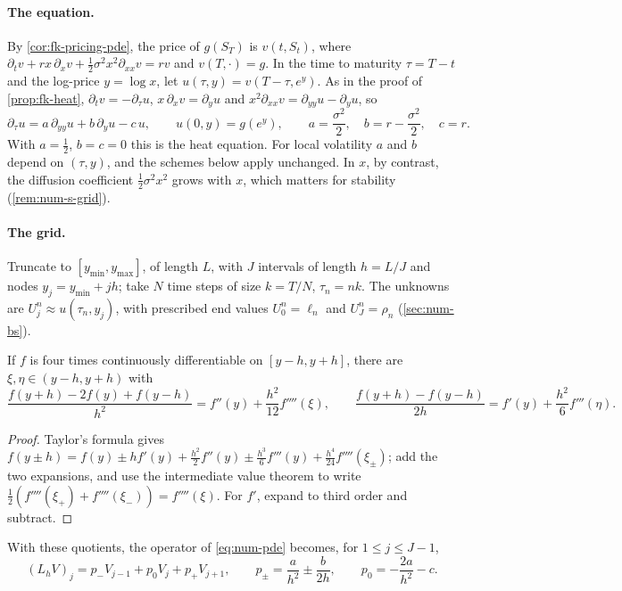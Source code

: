 \paragraph{The equation.} By \cref{cor:fk-pricing-pde}, the price of $g(S_T)$ is $v(t,S_t)$, where
$\partial_tv+rx\,\partial_xv+\frac12\sigma^2x^2\partial_{xx}v=rv$ and $v(T,\cdot)=g$. In the time to maturity
$\tau=T-t$ and the log-price $y=\log x$, let $u(\tau,y)=v(T-\tau,e^y)$. As in the proof of
\cref{prop:fk-heat}, $\partial_tv=-\partial_\tau u$, $x\,\partial_xv=\partial_yu$ and $x^2\partial_{xx}v=\partial_{yy}u-\partial_yu$, so
\begin{equation}\label{eq:num-pde}
  \partial_\tau u=a\,\partial_{yy}u+b\,\partial_yu-c\,u,\qquad u(0,y)=g(e^y),\qquad
  a=\frac{\sigma^2}2,\quad b=r-\frac{\sigma^2}2,\quad c=r .
\end{equation}
With $a=\frac12$, $b=c=0$ this is the heat equation. For local volatility $a$ and $b$ depend on
$(\tau,y)$, and the schemes below apply unchanged. In $x$, by contrast, the diffusion coefficient
$\frac12\sigma^2x^2$ grows with $x$, which matters for stability (\cref{rem:num-s-grid}).

\paragraph{The grid.} Truncate to $[y_{\min},y_{\max}]$, of length $L$, with $J$ intervals of length
$h=L/J$ and nodes $y_j=y_{\min}+jh$; take $N$ time steps of size $k=T/N$, $\tau_n=nk$. The unknowns
are $U^n_j\approx u(\tau_n,y_j)$, with prescribed end values $U^n_0=\ell_n$ and $U^n_J=\rho_n$
(\cref{sec:num-bs}).

\begin{lemma}\label{lem:num-taylor}
If $f$ is four times continuously differentiable on $[y-h,y+h]$, there are $\xi,\eta\in(y-h,y+h)$ with
\[
  \frac{f(y+h)-2f(y)+f(y-h)}{h^2}=f''(y)+\frac{h^2}{12}f''''(\xi),\qquad
  \frac{f(y+h)-f(y-h)}{2h}=f'(y)+\frac{h^2}{6}f'''(\eta).
\]
\end{lemma}

\begin{proof}
Taylor's formula gives
$f(y\pm h)=f(y)\pm hf'(y)+\frac{h^2}2f''(y)\pm\frac{h^3}6f'''(y)+\frac{h^4}{24}f''''(\xi_\pm)$; add the two
expansions, and use the intermediate value theorem to write
$\frac12(f''''(\xi_+)+f''''(\xi_-))=f''''(\xi)$. For $f'$, expand to third order and subtract.
\end{proof}

With these quotients, the operator of \eqref{eq:num-pde} becomes, for $1\le j\le J-1$,
\begin{equation}\label{eq:num-coefficients}
  (L_hV)_j=p_-V_{j-1}+p_0V_j+p_+V_{j+1},\qquad
  p_\pm=\frac a{h^2}\pm\frac b{2h},\qquad p_0=-\frac{2a}{h^2}-c .
\end{equation}

